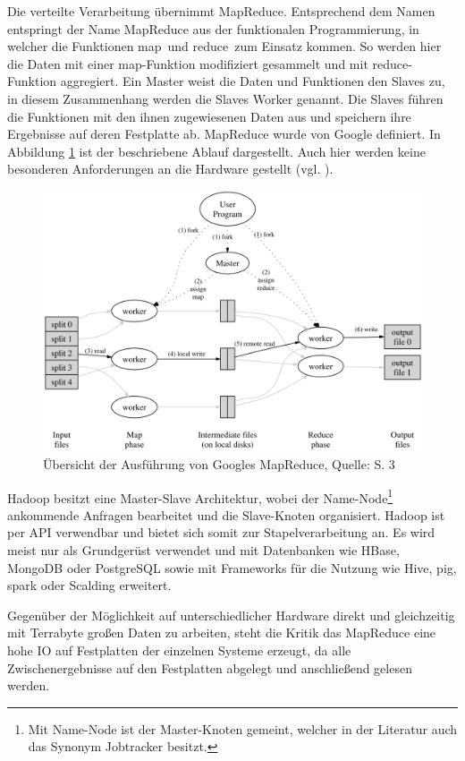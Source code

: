 Die verteilte Verarbeitung übernimmt MapReduce.
Entsprechend dem Namen entspringt der Name MapReduce aus der funktionalen Programmierung, in welcher die Funktionen \glqq map\grqq \ und \glqq reduce\grqq \ zum Einsatz kommen.
So werden hier die Daten mit einer map-Funktion modifiziert gesammelt und mit reduce-Funktion aggregiert.
Ein Master weist die Daten und Funktionen den Slaves zu, in diesem Zusammenhang werden die Slaves Worker genannt.
Die Slaves führen die Funktionen mit den ihnen zugewiesenen Daten aus und speichern ihre Ergebnisse auf deren Festplatte ab.
MapReduce wurde von Google definiert.
In Abbildung \ref{fig:mapreduce} ist der beschriebene Ablauf dargestellt.
Auch hier werden keine besonderen Anforderungen an die Hardware gestellt (vgl. \cite[S.3]{paper:mapreduce}).
%
\begin{figure}[h!]
\centering
\includegraphics[width=\textwidth]{Abbildungen/mapreduce.png}
\caption[Übersicht der Ausführung von Googles MapReduce]{Übersicht der Ausführung von Googles MapReduce, Quelle: \cite{paper:mapreduce} S. 3}
\label{fig:mapreduce}
\end{figure}
Hadoop besitzt eine Master-Slave Architektur, wobei der Name-Node\footnote{Mit Name-Node ist der Master-Knoten gemeint, welcher in der Literatur auch das Synonym Jobtracker besitzt.} ankommende Anfragen bearbeitet und die Slave-Knoten organisiert.
Hadoop ist per API verwendbar und bietet sich somit zur Stapelverarbeitung an. %
Es wird meist nur als Grundgerüst verwendet und mit Datenbanken wie HBase, MongoDB oder PostgreSQL sowie mit Frameworks für die Nutzung wie Hive, \Gls{pig}, \Gls{spark} oder Scalding erweitert.

Gegenüber der Möglichkeit auf unterschiedlicher Hardware direkt und gleichzeitig mit Terrabyte großen Daten zu arbeiten, steht die Kritik das MapReduce eine hohe IO auf Festplatten der einzelnen Systeme erzeugt, da alle Zwischenergebnisse auf den Festplatten abgelegt und anschließend gelesen werden.

